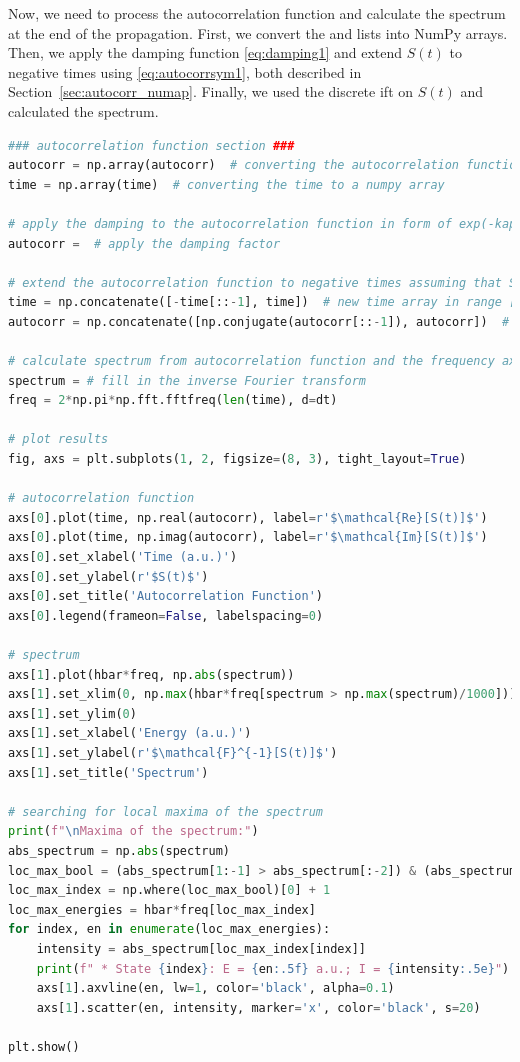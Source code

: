 Now, we need to process the autocorrelation function and calculate the spectrum at the end of the propagation. First, we convert the  and  lists into NumPy arrays. Then, we apply the damping function \eqref{eq:damping1} and extend $S(t)$ to negative times using \eqref{eq:autocorrsym1}, both described in Section~\ref{sec:autocorr_numap}. Finally, we used the discrete \acrshort{ift} on $S(t)$ and calculated the spectrum. 
\begin{lstlisting}[language=Python, style=mystyle2]
### autocorrelation function section ###
autocorr = np.array(autocorr)  # converting the autocorrelation function to a numpy array
time = np.array(time)  # converting the time to a numpy array

# apply the damping to the autocorrelation function in form of exp(-kappa*time)
autocorr =  # apply the damping factor

# extend the autocorrelation function to negative times assuming that S(t) = S^*(-t)
time = np.concatenate([-time[::-1], time])  # new time array in range [-t_max, t_max]
autocorr = np.concatenate([np.conjugate(autocorr[::-1]), autocorr])  # new symmetric autocorr in range [-t_max, t_max]

# calculate spectrum from autocorrelation function and the frequency axis corresponding to it
spectrum = # fill in the inverse Fourier transform
freq = 2*np.pi*np.fft.fftfreq(len(time), d=dt)

# plot results
fig, axs = plt.subplots(1, 2, figsize=(8, 3), tight_layout=True)

# autocorrelation function
axs[0].plot(time, np.real(autocorr), label=r'$\mathcal{Re}[S(t)]$')
axs[0].plot(time, np.imag(autocorr), label=r'$\mathcal{Im}[S(t)]$')
axs[0].set_xlabel('Time (a.u.)')
axs[0].set_ylabel(r'$S(t)$')
axs[0].set_title('Autocorrelation Function')
axs[0].legend(frameon=False, labelspacing=0)

# spectrum
axs[1].plot(hbar*freq, np.abs(spectrum))
axs[1].set_xlim(0, np.max(hbar*freq[spectrum > np.max(spectrum)/1000]))
axs[1].set_ylim(0)
axs[1].set_xlabel('Energy (a.u.)')
axs[1].set_ylabel(r'$\mathcal{F}^{-1}[S(t)]$')
axs[1].set_title('Spectrum')

# searching for local maxima of the spectrum
print(f"\nMaxima of the spectrum:")
abs_spectrum = np.abs(spectrum)
loc_max_bool = (abs_spectrum[1:-1] > abs_spectrum[:-2]) & (abs_spectrum[1:-1] > abs_spectrum[2:])
loc_max_index = np.where(loc_max_bool)[0] + 1
loc_max_energies = hbar*freq[loc_max_index]
for index, en in enumerate(loc_max_energies):
    intensity = abs_spectrum[loc_max_index[index]]
    print(f" * State {index}: E = {en:.5f} a.u.; I = {intensity:.5e}")
    axs[1].axvline(en, lw=1, color='black', alpha=0.1)
    axs[1].scatter(en, intensity, marker='x', color='black', s=20)

plt.show()
\end{lstlisting}

